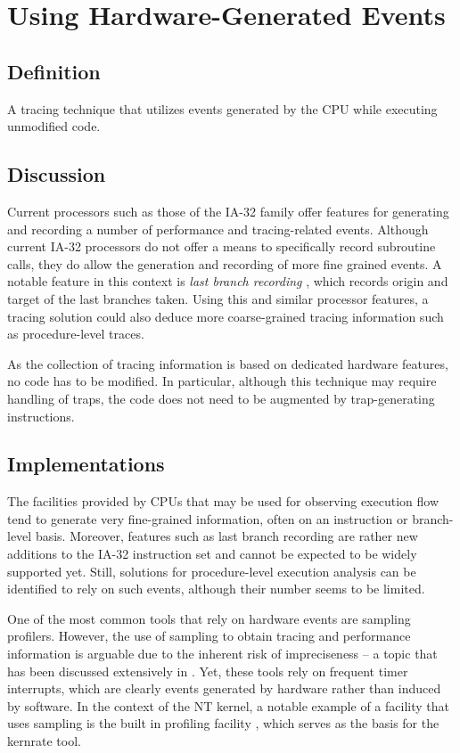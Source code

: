 

\section{Using Hardware-Generated Events}
\subsection*{Definition} 
A tracing technique that utilizes events generated by the CPU while executing unmodified code.

\subsection*{Discussion}
Current processors such as those of the IA-32 family offer features for generating and
recording a number of performance and tracing-related events. Although current IA-32 processors do 
not offer a means to specifically record subroutine calls, they do allow the generation and recording
of more fine grained events. A notable feature in this context is \emph{last branch recording} 
\cite{intel07_3B}, which records origin and target of the last branches taken. Using this and 
similar processor features, a tracing solution could also deduce more coarse-grained 
tracing information such as procedure-level traces.

As the collection of tracing information is based on dedicated hardware features, 
no code has to be modified. In particular, although this technique may require handling of 
traps, the code does not need to be augmented by trap-generating instructions. 

\subsection*{Implementations}
The facilities provided by CPUs that may be used for observing execution flow
tend to generate very fine-grained information, often on an instruction or 
branch-level basis. Moreover, features such as last branch recording are rather new additions 
to the IA-32 instruction set and cannot be expected to be widely supported yet. 
Still, solutions for procedure-level execution analysis
can be identified to rely on such events, although their number seems to be limited.

One of the most common tools that rely on hardware events are sampling profilers. However, the 
use of sampling to obtain tracing and performance information is arguable due 
to the inherent risk of impreciseness -- a topic that has been discussed extensively in 
\cite{Tamches01}. Yet, these tools rely on frequent timer
interrupts, which are clearly events generated by hardware rather than induced by software. In
the context of the NT kernel, a notable example of a facility that uses sampling is
the built in profiling facility \cite{Nebbett00}, which serves as the basis for the kernrate tool.

